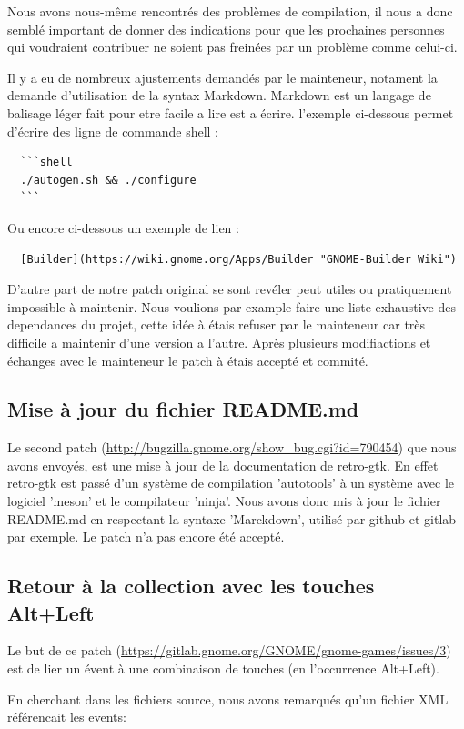 \documentclass[12pt]{report}
\begin{document}
Nous avons nous-même rencontrés des problèmes de compilation, il nous a donc
semblé important de donner des indications pour que les prochaines personnes qui
voudraient contribuer ne soient pas freinées par un problème comme celui-ci.

Il y a eu de nombreux ajustements demandés par le mainteneur, notament la demande
d'utilisation de la syntax Markdown.
Markdown est un langage de balisage léger fait pour etre facile a lire est a écrire.
l'exemple ci-dessous permet d'écrire des ligne de commande shell :
\begin{verbatim}
  ```shell
  ./autogen.sh && ./configure
  ```
\end{verbatim}
Ou encore ci-dessous un exemple de lien :
\begin{verbatim}
  [Builder](https://wiki.gnome.org/Apps/Builder "GNOME-Builder Wiki")
\end{verbatim}

D'autre part de notre patch original se sont revéler peut utiles ou pratiquement
impossible à maintenir. Nous voulions par example faire une liste exhaustive des
dependances du projet, cette idée à étais refuser par le mainteneur car très
difficile a maintenir d'une version a l'autre.
Après plusieurs modifiactions et échanges avec le mainteneur le patch à étais
accepté et commité.

\subsection{Mise à jour du fichier README.md}
\label{README}
Le second patch (\url{http://bugzilla.gnome.org/show_bug.cgi?id=790454}) 
que nous avons envoyés, est une mise à jour de la documentation de retro-gtk.
En effet retro-gtk est passé d'un système de compilation 'autotools' à un
système avec le logiciel 'meson' et le compilateur 'ninja'.
Nous avons donc mis à jour le fichier README.md en respectant la syntaxe
'Marckdown', utilisé par github et gitlab par exemple.
Le patch n'a pas encore été accepté.

\subsection{Retour à la collection avec les touches Alt+Left}
Le but de ce patch (\url{https://gitlab.gnome.org/GNOME/gnome-games/issues/3})
est de lier un évent à une combinaison de touches (en l’occurrence Alt+Left).

En cherchant dans les fichiers source, nous avons remarqués qu'un
fichier XML référencait les events:
\end{document}
